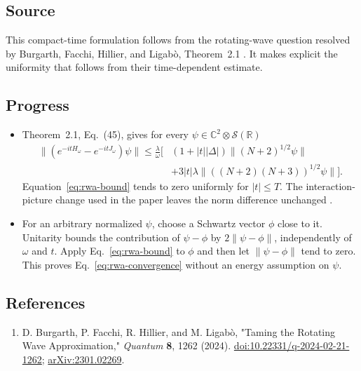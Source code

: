 \subsection*{Source}

This compact-time formulation follows from the rotating-wave question resolved by Burgarth, Facchi, Hillier, and Ligabò, Theorem~2.1 .
It makes explicit the uniformity that follows from their time-dependent estimate.

\subsection*{Progress}

\begin{itemize}
  \item Theorem~2.1, Eq.~(45), gives for every $\psi\in\mathbb C^2\otimes\mathcal S(\mathbb R)$
\begin{equation}
 \begin{aligned}
 \|(e^{-itH_\omega}-e^{-itJ_\omega})\psi\|
 \leq\frac{\lambda}{\omega}\bigl[
 &(1+|t||\Delta|)\|(N+2)^{1/2}\psi\|\\
 &+3|t|\lambda\|((N+2)(N+3))^{1/2}\psi\|\bigr].
 \end{aligned}
 \label{eq:rwa-bound}
\end{equation}
Equation~\eqref{eq:rwa-bound} tends to zero uniformly for $|t|\leq T$.
The interaction-picture change used in the paper leaves the norm difference unchanged .

  \item For an arbitrary normalized $\psi$, choose a Schwartz vector $\phi$ close to it.
Unitarity bounds the contribution of $\psi-\phi$ by $2\|\psi-\phi\|$, independently of $\omega$ and $t$.
Apply Eq.~\eqref{eq:rwa-bound} to $\phi$ and then let $\|\psi-\phi\|$ tend to zero.
This proves Eq.~\eqref{eq:rwa-convergence} without an energy assumption on $\psi$.
\end{itemize}

\subsection*{References}

\begin{enumerate}[label={},leftmargin=4.8em,labelsep=0.5em]
  \footnotesize
  \item[\textup{[BFHL24]}]\label{ref:rwa-bfhl}
  D. Burgarth, P. Facchi, R. Hillier, and M. Ligabò, "Taming the Rotating Wave Approximation," \emph{Quantum} \textbf{8}, 1262 (2024). \href{https://doi.org/10.22331/q-2024-02-21-1262}{doi:10.22331/q-2024-02-21-1262}; \href{https://arxiv.org/abs/2301.02269}{arXiv:2301.02269}.
\end{enumerate}

